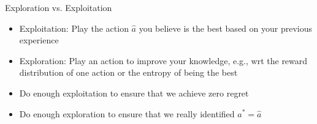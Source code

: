 \begin{frame}[c]{Exploration vs. Exploitation}
	
	\begin{itemize}
		\item \alert{Exploitation}: Play the action $\hat{a}$ you believe is the best based on your previous experience
		\medskip
		\item \alert{Exploration}: Play an action to improve your knowledge, e.g., wrt the reward distribution of one action or the entropy of being the best
		\medskip
		\pause
		\item Do enough exploitation to ensure that we achieve zero regret
		\item Do enough exploration to ensure that we really identified $a^* = \hat{a}$
	\end{itemize}
	
\end{frame}

